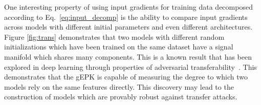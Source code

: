 

One interesting property of using input gradients for training data decomposed according to Eq.~\ref{eq:input_decomp} is the ability to compare input gradients across models with different initial parameters and even different architectures.
Figure \ref{fig:trans} demonstrates that two models with different random initializations which have been trained on the same dataset have a signal manifold which shares many components.
This is a known result that has been explored in deep learning through properties of adversarial transferability~\citet{szegedy2013intriguing}.
This demonstrates that the gEPK is capable of measuring the degree to which two models rely on the same features directly.
This discovery may lead to the construction of models which are provably robust against transfer attacks.

